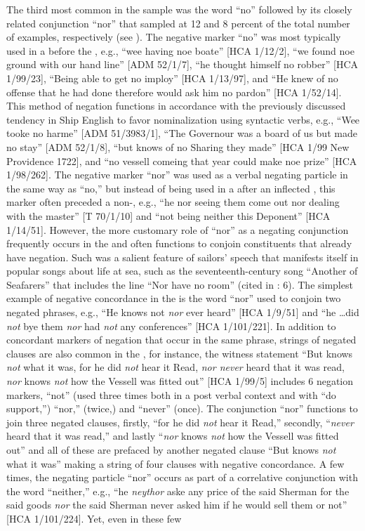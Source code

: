 The third most common  in the sample was the word “no” followed by its closely related conjunction “nor” that sampled at 12 and 8 percent of the total number of examples, respectively (see ). The negative marker “no” was most typically used in a  before the , e.g., “wee having noe boate” [HCA 1/12/2], “we found noe ground with our hand line” [ADM 52/1/7], “he thought himself no robber” [HCA 1/99/23], “Being able to get no imploy” [HCA 1/13/97], and “He knew of no offense that he had done therefore would ask him no pardon” [HCA 1/52/14]. This method of negation functions in accordance with the previously discussed tendency in Ship English to favor nominalization using syntactic verbs, e.g., “Wee tooke no harme” [ADM 51/3983/1], “The Governour was a board of us but made no stay” [ADM 52/1/8], “but knows of no Sharing they made” [HCA 1/99 New Providence 1722], and “no vessell comeing that year could make noe prize” [HCA 1/98/262]. The negative marker “nor” was used as a verbal negating particle in the same way as “no,” but instead of being used in a  after an inflected , this marker often preceded a non-, e.g., “he nor seeing them come out nor dealing with the master” [T 70/1/10] and “not being neither this Deponent” [HCA 1/14/51]. However, the more customary role of “nor” as a negating conjunction frequently occurs in the  and often functions to conjoin constituents that already have negation. Such  was a salient feature of sailors’ speech that manifests itself in popular songs about life at sea, such as the seventeenth-century song “Another of Seafarers” that includes the line “Nor have no room” (cited in \citealt{Palmer1986}: 6). The simplest example of negative concordance in the  is the word “nor” used to conjoin two negated  phrases, e.g., “He knows not \textit{nor} ever heard” [HCA 1/9/51] and “he …did \textit{not} bye them \textit{nor} had \textit{not} any conferences” [HCA 1/101/221]. In addition to concordant markers of negation that occur in the same phrase, strings of negated clauses are also common in the , for instance, the witness statement “But knows \textit{not} what it was, for he did \textit{not} hear it Read, \textit{nor never} heard that it was read, \textit{nor} knows \textit{not} how the Vessell was fitted out” [HCA 1/99/5] includes 6 negation markers, “not” (used three times both in a post verbal context and with “do support,”) “nor,” (twice,) and “never” (once). The conjunction “nor” functions to join three negated clauses, firstly, “for he did \textit{not} hear it Read,” secondly, “\textit{never} heard that it was read,” and lastly “\textit{nor} knows \textit{not} how the Vessell was fitted out” and all of these are prefaced by another negated clause “But knows \textit{not} what it was” making a string of four clauses with negative concordance. A few times, the negating particle “nor” occurs as part of a correlative conjunction with the word “neither,” e.g., “he \textit{neythor} aske any price of the said Sherman for the said goods \textit{nor} the said Sherman never asked him if he would sell them or not” [HCA 1/101/224]. Yet, even in these few 